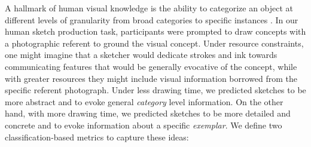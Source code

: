 \documentclass[10pt,letterpaper]{article}
\makeatletter
\newcommand{\hh}[1]{\textcolor{Blue}{@hh: #1}}
\makeatother
\begin{document}
A hallmark of human visual knowledge is the ability to categorize an object at different levels of granularity from broad categories to specific instances \cite{mervis1981categorization}. In our human sketch production task, participants were prompted to draw concepts with a photographic referent to ground the visual concept. 
Under resource constraints, one might imagine that a sketcher would dedicate strokes and ink towards communicating features that would be generally evocative of the concept, while with greater resources they might include visual information borrowed from the specific referent photograph.
Under less drawing time, we predicted sketches to be more abstract and to evoke general \textit{category} level information.
On the other hand, with more drawing time, we predicted sketches to be more detailed and concrete and to evoke information about a specific \textit{exemplar}.
We define two classification-based metrics to capture these ideas:
\end{document}
